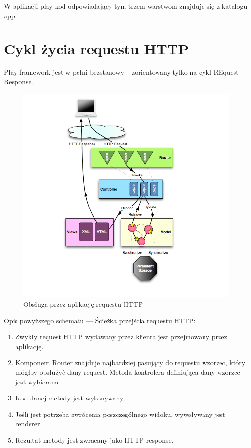 \documentclass[a4paper,12pt,notitlepage]{mwrep}
\begin{document}
\vspace*{1cm}
\noindent
W aplikacji play kod odpowiadający tym trzem warstwom znajduje się z katalogu app.


\newpage
\section{Cykl życia requestu HTTP}

Play framework jest w pełni bezstanowy -- zorientowany tylko na cykl REquest-Response.

\begin{figure}[H]
\centering
\includegraphics[scale=0.7]{images/diagrams_path.png}
\caption{Obsługa przez aplikację requestu HTTP}
\label{fig:mvc_2}
\end{figure}


Opis powyższego schematu --- Ścieżka przejścia requestu HTTP:
\begin{enumerate}
	\item	Zwykły request HTTP wydawany przez klienta jest przejmowany przez aplikację.
	\item	Komponent Router znajduje najbardziej pasujący do requestu wzorzec, który mógłby
		obsłużyć dany request. Metoda kontrolera definiująca dany wzorzec jest wybierana.
	\item	Kod danej metody jest wykonywany.
	\item	Jeśli jest potrzeba zwrócenia poszczególnego widoku, wywoływany jest renderer.
	\item	Rezultat metody jest zwracany jako HTTP response.
\end{enumerate}
\end{document}
